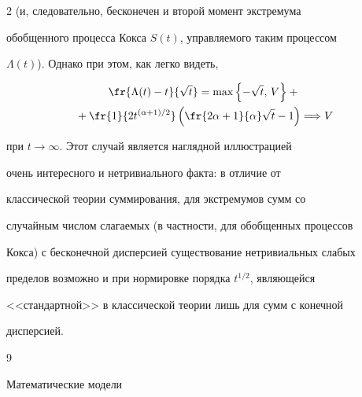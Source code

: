 \begin{multicols}{2}
(и, следовательно, бесконечен и второй момент экстремума


обобщенного процесса Кокса $S(t)$, управляемого таким процессом


$\Lambda(t)$). Однако при этом, как легко видеть,


{





}





\noindent


\begin{multline*}


\fr{\Lambda(t)-t}{\sqrt{t}}=


\max\left \{-\sqrt{t},\,V\right \}+{}\\


{}+


\fr{1}{2t^{(\alpha+1)/2}}\left (\fr{2\alpha+1}{\alpha}\sqrt{t}-1\right)


\Longrightarrow V


\end{multline*}


при $t\to\infty$. Этот случай является наглядной иллюстрацией


очень интересного и нетривиального факта: в отличие от


классической теории суммирования, для экстремумов сумм со


случайным числом слагаемых (в частности, для обобщенных процессов


Кокса) с бесконечной дисперсией существование нетривиальных слабых


пределов возможно и при нормировке порядка $t^{1/2}$, являющейся


<<стандартной>> в классической теории лишь для сумм с конечной


дисперсией.








{\small\frenchspacing


{%




\begin{thebibliography}{9}






Математические модели



\end{thebibliography}}}
\end{multicols}
